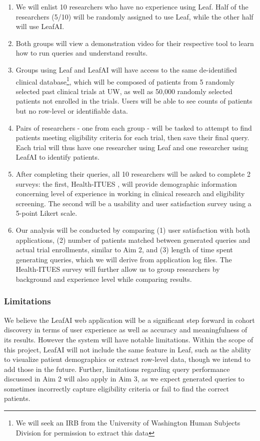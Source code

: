 \documentclass[../main.tex]{subfiles}
\begin{document}
\begin{enumerate}
    \item We will enlist 10 researchers who have no experience using Leaf. Half of the researchers (5/10) will be randomly assigned to use Leaf, while the other half will use LeafAI.
    \item Both groups will view a demonstration video for their respective tool to learn how to run queries and understand results.
    \item Groups using Leaf and LeafAI will have access to the same de-identified clinical database\footnote{We will seek an IRB from the University of Washington Human Subjects Division for permission to extract this data}, which will be composed of patients from 5 randomly selected past clinical trials at UW, as well as 50,000 randomly selected patients not enrolled in the trials. Users will be able to see counts of patients but no row-level or identifiable data.
    \item Pairs of researchers - one from each group - will be tasked to attempt to find patients meeting eligibility criteria for each trial, then save their final query. Each trial will thus have one researcher using Leaf and one researcher using LeafAI to identify patients.
    \item After completing their queries, all 10 researchers will be asked to complete 2 surveys: the first, Health-ITUES \cite{yen2010development}, will provide demographic information concerning level of experience in working in clinical research and eligibility screening. The second will be a usability and user satisfaction survey using a 5-point Likert scale.
    \item Our analysis will be conducted by comparing (1) user satisfaction with both applications, (2) number of patients matched between generated queries and actual trial enrollments, similar to Aim 2, and (3) length of time spent generating queries, which we will derive from application log files. The Health-ITUES survey will further allow us to group researchers by background and experience level while comparing results.
\end{enumerate}

\subsubsection{Limitations}

We believe the LeafAI web application will be a significant step forward in cohort discovery in terms of user experience as well as accuracy and meaningfulness of its results. However the system will have notable limitations. Within the scope of this project, LeafAI will not include the same feature in Leaf, such as the ability to visualize patient demographics or extract row-level data, though we intend to add those in the future. Further, limitations regarding query performance discussed in Aim 2 will also apply in Aim 3, as we expect generated queries to sometimes incorrectly capture eligibility criteria or fail to find the correct patients.
\end{document}
